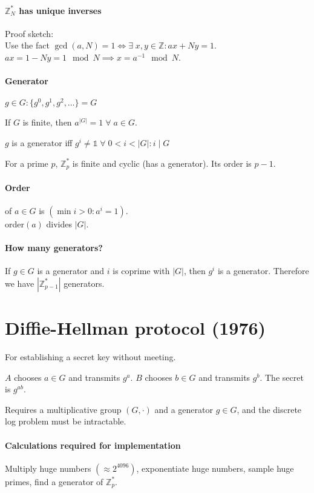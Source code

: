 \documentclass[11pt]{article}
\newcommand{\abs}[1]{{\ensuremath{\left\vert#1\right\vert}}}
\newcommand{\ZZ}{\ensuremath{\mathds{Z}}}
\newcommand{\I}{\ensuremath{\mathds{1}}}
\newcommand{\divides}{\mid}
\theoremstyle{remark}
\begin{document}
\paragraph{$\ZZ_N^*$ has unique inverses} Proof sketch:\\
Use the fact $\gcd(a,N)=1 \iff \exists\;x,y\in\ZZ:ax+Ny=1$.\\
$ax=1-Ny = 1 \mod N \implies x = a^{-1} \mod N$.

\paragraph{Generator} $g\in G: \{g^0,g^1,g^2,\ldots\} = G$

If $G$ is finite, then $a^\abs{G}=1\;\forall\;a\in G$.

$g$ is a generator iff $g^i\neq\I\;\forall\;0<i<\abs{G}:i\divides G$

For a prime $p$, $\ZZ_p^*$ is finite and cyclic (has a generator).
Its order is $p-1$.

\paragraph{Order} of $a\in G$ is $(\min i>0 : a^i=1)$.\\
order$(a)$ divides $\abs{G}$.

\paragraph{How many generators?}
If $g\in G$ is a generator and $i$ is coprime with $\abs{G}$,
then $g^i$ is a generator.
Therefore we have $\abs{\ZZ_{p-1}^*}$ generators.

\section{Diffie-Hellman protocol (1976)}

For establishing a secret key without meeting.

$A$ chooses $a \in G$ and transmits $g^a$.
$B$ chooses $b \in G$ and transmits $g^b$.
The secret is $g^{ab}$.

Requires a multiplicative group $(G,\cdot)$
and a generator $g\in G$,
and the discrete log problem must be intractable.

\paragraph{Calculations required for implementation}
Multiply huge numbers $(\approx 2^{4096})$,
exponentiate huge numbers,
sample huge primes, find a generator of $\ZZ_p^*$.
\end{document}
